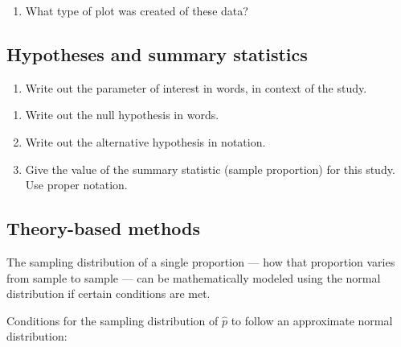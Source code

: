 \documentclass[
]{report}
\providecommand{\tightlist}{%
  \setlength{\itemsep}{0pt}\setlength{\parskip}{0pt}}
\begin{document}
\begin{enumerate}
\def\labelenumi{\arabic{enumi}.}
\tightlist
\item
  What type of plot was created of these data?
\end{enumerate}

\vspace{0.2in}

\subsection*{Hypotheses and summary statistics}\label{hypotheses-and-summary-statistics}

\begin{enumerate}
\def\labelenumi{\arabic{enumi}.}
\setcounter{enumi}{1}
\tightlist
\item
  Write out the parameter of interest in words, in context of the study.
\end{enumerate}

\vspace{0.8in}

\begin{enumerate}
\def\labelenumi{\arabic{enumi}.}
\setcounter{enumi}{2}
\item
  Write out the null hypothesis in words.
  \vspace{0.8in}
\item
  Write out the alternative hypothesis in notation.
  \vspace{0.3in}
\item
  Give the value of the summary statistic (sample proportion) for this study. Use proper notation.
\end{enumerate}

\vspace{0.3in}

\subsection*{Theory-based methods}\label{theory-based-methods-1}

The sampling distribution of a single proportion --- how that proportion varies from sample to sample --- can be mathematically modeled using the normal distribution if certain conditions are met.

Conditions for the sampling distribution of \(\hat{p}\) to follow an approximate normal distribution:
\end{document}
